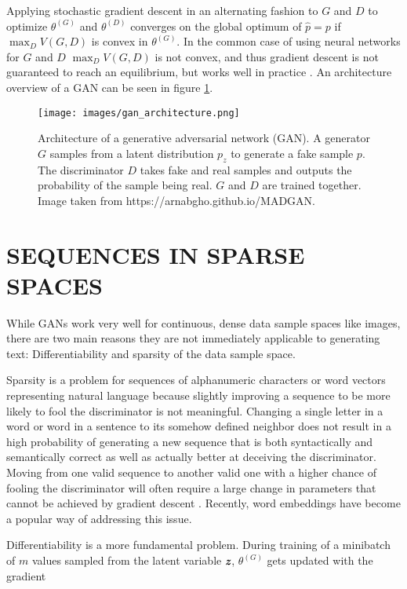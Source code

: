 \documentclass[a4paper,conference]{IEEEtran}
\def\mathbi#1{\textbf{\em #1}}
\begin{document}
Applying stochastic gradient descent in an alternating fashion to $G$ and $D$ to optimize $\theta^{(G)}$ and $\theta^{(D)}$ converges on the global optimum of $\hat{p} = p$ if $\max_{D} V(G, D)$ is convex in $\theta^{(G)}$. In the common case of using neural networks for $G$ and $D$ $\max_{D} V(G, D)$ is not convex, and thus gradient descent is not guaranteed to reach an equilibrium, but works well in practice \cite{c3}.
An architecture overview of a GAN can be seen in figure \ref{fig:gan-architecture}.


\begin{figure}[thpb]
      \centering
      \texttt{[image: images/gan\_architecture.png]}
      \caption{Architecture of a generative adversarial network (GAN).  A generator $G$ samples from a latent distribution $p_z$ to generate a fake sample $p$. The discriminator $D$ takes fake and real samples and outputs the probability of the sample being real. $G$ and $D$ are trained together. Image taken from https://arnabgho.github.io/MADGAN.}
      \label{fig:gan-architecture}
   \end{figure}


\section{SEQUENCES IN SPARSE SPACES}

While GANs work very well for continuous, dense data sample spaces like images, there are two main reasons they are not immediately applicable to generating text: Differentiability and sparsity of the data sample space.

Sparsity is a problem for sequences of alphanumeric characters or word vectors representing natural language because slightly improving a sequence to be more likely to fool the discriminator is not meaningful. Changing a single letter in a word or word in a sentence to its somehow defined neighbor does not result in a high probability of generating a new sequence that is both syntactically and semantically correct as well as actually better at deceiving the discriminator. Moving from one valid sequence to another valid one with a higher chance of fooling the discriminator will often require a large change in parameters that cannot be achieved by gradient descent \cite{c2}. Recently, word embeddings \cite{c5} have become a popular way of addressing this issue.

Differentiability is a more fundamental problem. During training of a minibatch of $m$ values sampled from the latent variable $\mathbi{z}$, $\theta^{(G)}$ gets updated with the gradient
\end{document}
